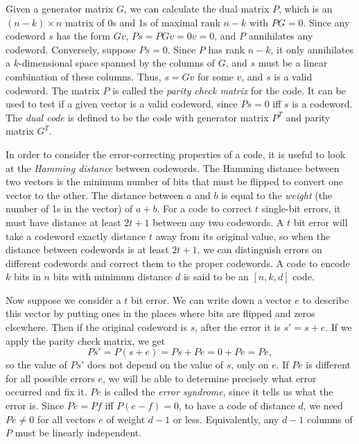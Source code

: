 \documentclass{report}
\begin{document}
Given a generator matrix $G$, we can calculate the dual matrix $P$, which 
is an $(n-k) \times n$ matrix of 0s and 1s of maximal rank $n-k$ with $P G = 
0$.  Since any codeword $s$ has the form $G v$, $P s = P G v = 0 v = 0$, and 
$P$ annihilates any codeword.  Conversely, suppose $P s = 0$.  Since $P$ 
has rank $n-k$, it only annihilates a $k$-dimensional space spanned by 
the columns of $G$, and $s$ must be a linear combination of these columns.  
Thus, $s = G v$ for some $v$, and $s$ is a valid codeword.  The matrix $P$ 
is called the {\em parity check matrix} for the code.  It can be used to test 
if a given vector is a valid codeword, since $P s = 0$ iff $s$ is a codeword.   
The {\em dual code} is defined to be the code with generator matrix $P^T$ 
and parity matrix $G^T$.

In order to consider the error-correcting properties of a code, it is useful to 
look at the {\em Hamming distance} between codewords.  The Hamming 
distance between two vectors is the minimum number of bits that must be 
flipped to convert one vector to the other.  The distance between $a$ and 
$b$ is equal to the {\em weight} (the number of 1s in the vector) of $a+b$.  
For a code to correct $t$ single-bit errors, it must have distance at least 
$2t+1$ between any two codewords.  A $t$ bit error will take a codeword exactly 
distance $t$ away from its original value, so when the distance between 
codewords is at least $2t+1$, we can distinguish errors on different 
codewords and correct them to the proper codewords.  A code to encode 
$k$ bits in $n$ bits with minimum distance $d$ is said to be an $[n, k, d]$ 
code.

Now suppose we consider a $t$ bit error.  We can write down a vector $e$ 
to describe this vector by putting ones in the places where bits are flipped
and zeros elsewhere.  Then if the original codeword is $s$, after the error it 
is $s' = s + e$.  If we apply the parity check matrix, we get
\begin{equation}
P s' = P (s + e) = P s + P e = 0 + P e = P e,
\end{equation}
so the value of $P s'$ does not depend on the value of $s$, only on $e$.  If 
$P e$ is different for all possible errors $e$, we will be able to determine 
precisely what error occurred and fix it.  $P e$ is called the {\em error 
syndrome}, since it tells us what the error is.  Since $P e = P f$ iff $P (e-f) 
= 0$, to have a code of distance $d$, we need $P e \neq 0$ for all vectors $e$ 
of weight $d-1$ or less.  Equivalently, any $d-1$ columns of $P$ must be 
linearly independent.
\end{document}
